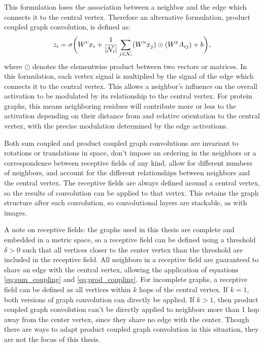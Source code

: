 This formulation loses the association between a neighbor and the edge which connects it to the central vertex. 
Therefore an alternative formulation, product coupled graph convolution, is defined as:
\begin{equation}
z_i = \sigma \bigg( W^{\textsc{c}} x_i + \frac{1}{|\mathcal{N}_i|}\sum_{j \in \mathcal{N}_i} (W^{\textsc{n}} x_j) \odot (W^{\textsc{e}} A_{ij}) + b \bigg),
\label{eq:prod_coupling}
\end{equation}
where $\odot$ denotes the elementwise product between two vectors or matrices. 
In this formulation, each vertex signal is multiplied by the signal of the edge which connects it to the central vertex.
This allows a neighbor's influence on the overall activation to be modulated by its relationship to the central vertex.
For protein graphs, this means neighboring residues will contribute more or less to the activation depending on their distance from and relative orientation to the central vertex, with the precise modulation determined by the edge activations.

Both sum coupled and product coupled graph convolutions are invariant to rotations or translations in space, don't impose an ordering in the neighbors or a correspondence between receptive fields of any kind, allow for different numbers of neighbors, and account for the different relationships between neighbors and the central vertex. 
The receptive fields are always defined around a central vertex, so the results of convolution can be applied to that vertex.
This retains the graph structure after each convolution, so convolutional layers are stackable, as with images.

A note on receptive fields: 
the graphs used in this thesis are complete and embedded in a metric space, so a receptive field can be defined using a threshold $\delta>0$ such that all vertices closer to the center vertex than the threshold are included in the receptive field.
All neighbors in a receptive field are guaranteed to share an edge with the central vertex, allowing the application of equations \ref{eq:sum_coupling} and \ref{eq:prod_coupling}.
For incomplete graphs, a receptive field can be defined as all vertices within $k$ hops of the central vertex. 
If $k=1$, both versions of graph convolution can directly be applied.
If $k>1$, then product coupled graph convolution can't be directly applied to neighbors more than 1 hop away from the center vertex, since they share no edge with the center. 
Though there are ways to adapt product coupled graph convolution in this situation, they are not the focus of this thesis.

